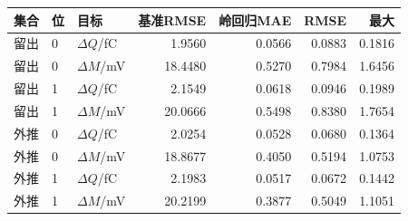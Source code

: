 \begin{tabular}{lllr rrr}
\toprule
集合 & 位 & 目标 & 基准RMSE & 岭回归MAE & RMSE & 最大\\
\midrule
留出 & 0 & $\Delta Q$/fC & 1.9560 & 0.0566 & 0.0883 & 0.1816\\
留出 & 0 & $\Delta M$/mV & 18.4480 & 0.5270 & 0.7984 & 1.6456\\
留出 & 1 & $\Delta Q$/fC & 2.1549 & 0.0618 & 0.0946 & 0.1989\\
留出 & 1 & $\Delta M$/mV & 20.0666 & 0.5498 & 0.8380 & 1.7654\\
外推 & 0 & $\Delta Q$/fC & 2.0254 & 0.0528 & 0.0680 & 0.1364\\
外推 & 0 & $\Delta M$/mV & 18.8677 & 0.4050 & 0.5194 & 1.0753\\
外推 & 1 & $\Delta Q$/fC & 2.1983 & 0.0517 & 0.0672 & 0.1442\\
外推 & 1 & $\Delta M$/mV & 20.2199 & 0.3877 & 0.5049 & 1.1051\\
\bottomrule\end{tabular}
